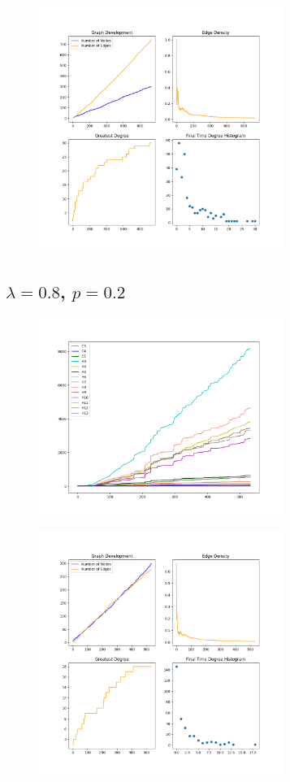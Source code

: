 \begin{figure}[h!]
    \includegraphics[width=8cm]{Images/twitter_sim_stats_3_0.2_0.2.png}
    \centering
\end{figure}

\FloatBarrier

\subsection*{$\lambda=0.8$, $p=0.2$}

\begin{figure}[h!]
    \includegraphics[width=8cm]{Images/twitter_sim_for_stats_3_0.8_0.2.png}
    \centering
\end{figure}

\begin{figure}[h!]
    \includegraphics[width=8cm]{Images/twitter_sim_stats_3_0.8_0.2.png}
    \centering
\end{figure}

